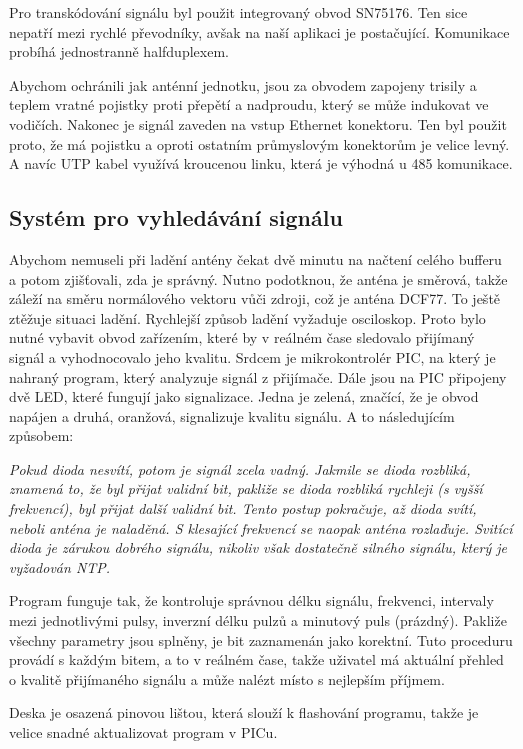     Pro transkódování signálu byl použit integrovaný obvod SN75176. Ten sice nepatří mezi rychlé
    převodníky, avšak na naší aplikaci je postačující. Komunikace probíhá jednostranně
    halfduplexem.

    Abychom ochránili jak anténní jednotku, jsou za obvodem zapojeny trisily a teplem
    vratné pojistky proti přepětí a nadproudu, který se může indukovat ve vodičích.
    Nakonec je signál zaveden na vstup Ethernet konektoru. Ten byl použit proto, že
    má pojistku a oproti ostatním průmyslovým konektorům je velice levný. A navíc UTP
    kabel využívá kroucenou linku, která je výhodná u 485 komunikace.

\subsection{Systém pro vyhledávání signálu}

    Abychom nemuseli při ladění antény čekat dvě minutu na načtení celého bufferu a potom
    zjišťovali, zda je správný. Nutno podotknou, že anténa je směrová, takže záleží na
    směru normálového vektoru vůči zdroji, což je anténa DCF77. To ještě ztěžuje situaci
    ladění. Rychlejší způsob ladění vyžaduje osciloskop. Proto bylo nutné vybavit
    obvod zařízením, které by v reálném čase sledovalo přijímaný signál a vyhodnocovalo
    jeho kvalitu.
    \newpage
    Srdcem je mikrokontrolér PIC, na který je nahraný program, který analyzuje signál z
    přijímače. Dále jsou na PIC připojeny dvě LED, které fungují jako signalizace. Jedna
    je zelená, značící, že je obvod napájen a druhá, oranžová, signalizuje kvalitu
    signálu. A to následujícím způsobem:
    \vspace{1em}

    \-\hspace{0cm} \textit{Pokud dioda nesvítí, potom je signál zcela vadný. Jakmile se dioda
    rozbliká, znamená to, že byl přijat validní bit, pakliže se dioda rozbliká rychleji (s
    vyšší frekvencí), byl přijat další validní bit. Tento postup pokračuje, až dioda
    svítí, neboli anténa je naladěná. S klesající frekvencí se naopak anténa rozlaďuje.
    Svitící dioda je zárukou dobrého signálu, nikoliv však dostatečně silného signálu,
    který je vyžadován NTP. }
    \vspace{1em}

    Program funguje tak, že kontroluje správnou délku signálu, frekvenci, intervaly mezi
    jednotlivými pulsy, inverzní délku pulzů a minutový puls (prázdný). Pakliže všechny
    parametry jsou splněny, je bit zaznamenán jako korektní. Tuto proceduru provádí s
    každým bitem, a to v reálném čase, takže uživatel má aktuální přehled o kvalitě
    přijímaného signálu a může nalézt místo s nejlepším příjmem.

    Deska je osazená pinovou lištou, která slouží k flashování programu, takže je velice
    snadné aktualizovat program v PICu.
